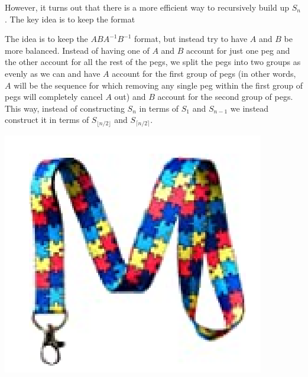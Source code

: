 \documentclass{article}
\begin{document}
However, it turns out that there is a more efficient way to recursively build up $S_n$. The key idea is to keep the format 

The idea is to keep the $ABA^{-1}B^{-1}$ format, but instead try to have $A$ and $B$ be more balanced. Instead of having one of $A$ and $B$ account for just one peg and the other account for all the rest of the pegs, we split the pegs into two groups as evenly as we can and have $A$ account for the first group of pegs (in other words, $A$ will be the sequence for which removing any single peg within the first group of pegs will completely cancel $A$ out) and $B$ account for the second group of pegs. This way, instead of constructing $S_n$ in terms of $S_1$ and $S_{n-1}$ we instead construct it in terms of $S_{\lfloor n/2\rfloor}$ and $S_{\lceil n/2 \rceil}$. 

\begin{center}
    \includegraphics[scale = 0.8]{images/lanyard1.png}
\end{center}
\end{document}
